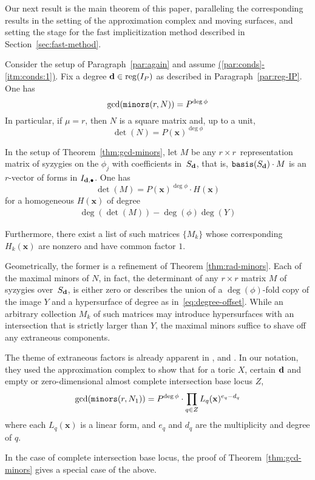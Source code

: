 \documentclass[fleqn,reqno]{amsart}
\renewcommand{\itmref}[2]{{\normalfont\hyperref[#1]{(\ref*{#2}-\ref*{#1})}}}
\begin{document}
\begin{paragraf*}
Our next result is the main theorem of this paper,
paralleling the corresponding results in the setting of
the approximation complex and moving surfaces,
and setting the stage for
the fast implicitization method described in Section~\ref{sec:fast-method}.
\end{paragraf*}

\begin{theorem}
\label{thm:gcd-minors}
Consider the setup of Paragraph~\ref{par:again} and assume \itmref{itm:conds:1}{par:conds}.
Fix a degree $\mathbf d\in\operatorname{reg}(I_P)$ as described in Paragraph~\ref{par:reg-IP}.
One has
\[
	\gcd(\mathop{\tt minors}(r, N))=P^{\deg\phi}
\]
In particular, if $\mu=r$, then $N$ is a square matrix and, up to a unit,
\[
	\det(N)=P(\mathbf x)^{\deg\phi}
\]
\end{theorem}

\begin{corollary}
\label{thm:detM}
In the setup of Theorem~\ref{thm:gcd-minors},
let $M$ be any $r\times r$~representation matrix of syzygies on the $\phi_j$
with coefficients in~$S_\mathbf d$,
that is, $\mathop{\tt basis}(S_\mathbf d)\cdot M$ is an $r$-vector of forms in $I_{\mathbf d,\bullet}$.
One has
\[
	\det(M)=P(\mathbf x)^{\deg\phi}\cdot H(\mathbf x)
\]
for a homogeneous $H(\mathbf x)$ of degree
\begin{align}
\label{eq:degree-offset}
\deg(\det(M))-\deg(\phi)\deg(Y)
\end{align}

Furthermore, there exist a list of such matrices $\{M_k\}$ whose
corresponding $H_k(\mathbf x)$ are nonzero and have common factor $1$.
\end{corollary}

\begin{paragraf*}
Geometrically, the former is a refinement of Theorem \ref{thm:rad-minors}.
Each of the maximal minors of $N$, in fact,
the determinant of any $r\times r$ matrix $M$ of syzygies over~$S_\mathbf d$, is either zero
or describes the union of a $\deg(\phi)$-fold copy of the image $Y$ and
a hypersurface of degree as in~\eqref{eq:degree-offset}.
While an arbitrary collection $M_k$ of such matrices may introduce hypersurfaces
with an intersection that is strictly larger than $Y$,
the maximal minors suffice to shave off any extraneous components.

The theme of extraneous factors is already apparent in
\citet{BCD-03}, \citet{BCJ-09} and \citet{BDD-09}.
In our notation, they used the approximation complex to show that for a toric $X$,
certain $\mathbf d$ and empty or zero-dimensional almost complete intersection base locus $Z$,
\[
	\gcd(\mathop{\tt minors}(r,N_1))=P^{\deg\phi}\cdot\prod_{q\in Z} L_q(\mathbf x)^{e_q-d_q}
\]
where each $L_q(\mathbf x)$ is a linear form, and
$e_q$ and $d_q$ are the multiplicity and degree of $q$.

In the case of complete intersection base locus, the proof of Theorem~\ref{thm:gcd-minors}
gives a special case of the above.
\end{paragraf*}
\end{document}
